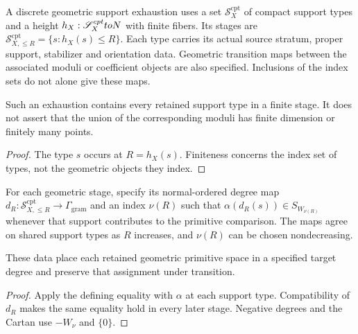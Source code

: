 \begin{definition}
\label{def:source-window-compact-support-exhaustion}
A discrete geometric support exhaustion uses a set
$\mathscr S_X^{\mathrm{cpt}}$ of compact support types and a height
$h_X:\mathscr S_X^{cpt}toN$ with finite fibers. Its stages are
$\mathscr S_{X,\leq R}^{\mathrm{cpt}}=\{s:h_X(s)\leq R\}$.
Each type carries its actual source stratum, proper support,
stabilizer and orientation data. Geometric transition maps between
the associated moduli or coefficient objects are also specified.
Inclusions of the index sets do not alone give these maps.
\end{definition}

\begin{proposition}
\label{prop:source-window-compact-support-criterion}
Such an exhaustion contains every retained support type in a
finite stage. It does not assert that the union of the corresponding
moduli has finite dimension or finitely many points.
\end{proposition}
\begin{proof}
The type $s$ occurs at $R=h_X(s)$. Finiteness concerns the index
set of types, not the geometric objects they index.
\end{proof}

\begin{definition}
\label{def:target-source-window-compatibility}
For each geometric stage, specify its normal-ordered degree map
$d_R:\mathscr S_{X,\leq R}^{\mathrm{cpt}}\to\Gamma_{\mathrm{gram}}$
and an index $\nu(R)$ such that
$\alpha(d_R(s))\in S_{W_{\nu(R)}}$ whenever that support contributes
to the primitive comparison. The maps agree on shared support types
as $R$ increases, and $\nu(R)$ can be chosen nondecreasing.
\end{definition}

\begin{proposition}
\label{prop:target-source-window-compatibility-criterion}
These data place each retained geometric primitive space in a
specified target degree and preserve that assignment under transition.
\end{proposition}
\begin{proof}
Apply the defining equality with $\alpha$ at each support type.
Compatibility of $d_R$ makes the same equality hold in every later
stage. Negative degrees and the Cartan use $-W_\nu$ and $\{0\}$.
\end{proof}

